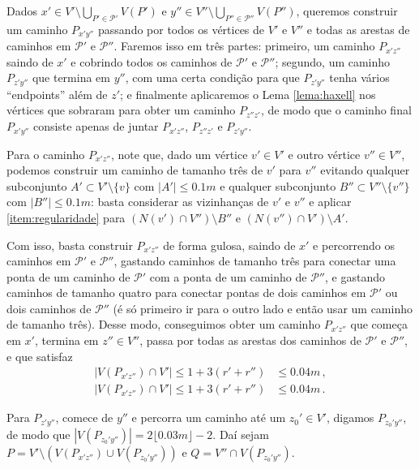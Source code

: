 \begin{dem}
	Dados $x'\in V'\setminus\bigcup_{P'\in \mathcal{P}'}V(P')$ e $y''\in V''\setminus\bigcup_{P''\in \mathcal{P}''}V(P'')$, queremos construir um caminho $P_{x'y''}$ passando por todos os vértices de $V'$ e $V''$ e todas as arestas de caminhos em $\mathcal{P}'$ e $\mathcal{P}''$. Faremos isso em três partes: primeiro, um caminho $P_{x'z''}$ saindo de $x'$ e cobrindo todos os caminhos de $\mathcal{P}'$ e $\mathcal{P}''$; segundo, um caminho $P_{z'y''}$ que termina em $y''$, com uma certa condição para que $P_{z'y''}$ tenha vários ``endpoints'' além de $z'$; e finalmente aplicaremos o Lema \ref{lema:haxell} nos vértices que sobraram para obter um caminho $P_{z''z'}$, de modo que o caminho final $P_{x'y''}$ consiste apenas de juntar $P_{x'z''}$, $P_{z''z'}$ e $P_{z'y''}$.
	
	Para o caminho $P_{x'z''}$, note que, dado um vértice $v'\in V'$ e outro vértice $v''\in V''$, podemos construir um caminho de tamanho três de $v'$ para $v''$ evitando qualquer subconjunto $A'\subset V'\setminus\{v\}$ com $|A'|\leq0.1m$ e qualquer subconjunto $B''\subset V''\setminus\{v''\}$ com $|B''|\leq0.1m$: basta considerar as vizinhanças de $v'$ e $v''$ e aplicar \ref{item:regularidade} para $(N(v')\cap V'')\setminus B''$ e $(N(v'')\cap V')\setminus A'$.
	
	Com isso, basta construir $P_{x'z''}$ de forma gulosa, saindo de $x'$ e percorrendo os caminhos em $\mathcal{P}'$ e $\mathcal{P}''$, gastando caminhos de tamanho três para conectar uma ponta de um caminho de $\mathcal{P}'$ com a ponta de um caminho de $\mathcal{P}''$, e gastando caminhos de tamanho quatro para conectar pontas de dois caminhos em $\mathcal{P}'$ ou dois caminhos de $\mathcal{P}''$ (é só primeiro ir para o outro lado e então usar um caminho de tamanho três). Desse modo, conseguimos obter um caminho $P_{x'z''}$ que começa em $x'$, termina em $z''\in V''$, passa por todas as arestas dos caminhos de $\mathcal{P}'$ e $\mathcal{P}''$, e que satisfaz
	\begin{align*}
	|V(P_{x'z''})\cap V'|\leq 1 + 3(r' + r'')&\leq 0.04m \,,\\
	|V(P_{x'z''})\cap V'|\leq 1 + 3(r' + r'')&\leq 0.04m \,.
	\end{align*}
	
	Para $P_{z'y''}$, comece de $y''$ e percorra um caminho até um $z_0'\in V'$, digamos $P_{z_0'y''}$, de modo que $|V(P_{z_0'y''})| = 2\lfloor0.03m\rfloor - 2$. Daí sejam $P = V'\setminus (V(P_{x'z''})\cup V(P_{z_0'y''}))$ e $Q = V''\cap V(P_{z_0'y''})$.
	

\end{dem}

